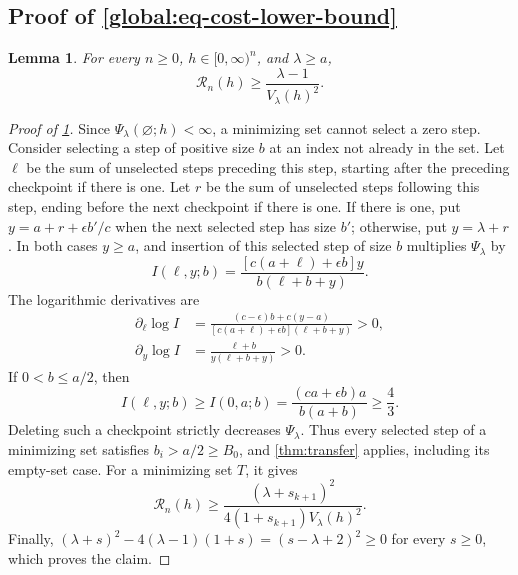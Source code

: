 \documentclass[11pt,letterpaper]{article}
\newtheorem{lemma}[lemma]{Lemma}
\theoremstyle{definition}
\begin{document}
\subsection[Proof of (\ref{global:eq-cost-lower-bound})]{Proof of \eqref{global:eq-cost-lower-bound}}
\label{global:app-cost-lower-bound}

\begin{lemma}
\label{lem:cost-lower-bound}
For every $n\ge0$, $h\in[0,\infty)^n$, and $\lambda\ge a$,
\begin{equation*}
  \mathcal R_n(h)\ge\frac{\lambda-1}{V_\lambda(h)^2}.
\end{equation*}
\end{lemma}

\begin{proof}[Proof of \cref{lem:cost-lower-bound}]
Since $\Psi_\lambda(\varnothing;h)<\infty$, a minimizing set cannot select a zero step.
Consider selecting a step of positive size $b$ at an index not already in the set.
Let $\ell$ be the sum of unselected steps preceding this step, starting after the preceding checkpoint if there is one.
Let $r$ be the sum of unselected steps following this step, ending before the next checkpoint if there is one.
If there is one, put $y=a+r+\epsilon b'/c$ when the next selected step has size $b'$; otherwise, put $y=\lambda+r$.
In both cases $y\ge a$, and insertion of this selected step of size $b$ multiplies $\Psi_\lambda$ by
\begin{equation}
  I(\ell,y;b)=\frac{[c(a+\ell)+\epsilon b]y}{b(\ell+b+y)}.
  \label{global:eq-insertion-ratio}
\end{equation}
The logarithmic derivatives are
\begin{align*}
  \partial_\ell\log I
    &=\frac{(c-\epsilon)b+c(y-a)}{[c(a+\ell)+\epsilon b](\ell+b+y)}>0,\\
  \partial_y\log I
    &=\frac{\ell+b}{y(\ell+b+y)}>0.
\end{align*}
If $0<b\le a/2$, then
\[
  I(\ell,y;b)\ge I(0,a;b)
  =\frac{(ca+\epsilon b)a}{b(a+b)}\ge\frac43.
\]
Deleting such a checkpoint strictly decreases $\Psi_\lambda$.
Thus every selected step of a minimizing set satisfies $b_i>a/2\ge B_0$, and \cref{thm:transfer} applies, including its empty-set case.
For a minimizing set $T$, it gives
\[
  \mathcal R_n(h)\ge
  \frac{(\lambda+s_{k+1})^2}
       {4(1+s_{k+1})V_\lambda(h)^2}.
\]
Finally, $ (\lambda+s)^2-4(\lambda-1)(1+s)=(s-\lambda+2)^2\ge0$ for every $s\ge0$, which proves the claim.
\end{proof}
\end{document}

